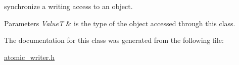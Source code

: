 synchronize a writing access to an object. 


\begin{DoxyParams}{Parameters}
{\em Value\-T} & is the type of the object accessed through this class. \\
\hline
\end{DoxyParams}


The documentation for this class was generated from the following file\-:\begin{DoxyCompactItemize}
\item 
\hyperlink{atomic__writer_8h}{atomic\-\_\-writer.\-h}\end{DoxyCompactItemize}
